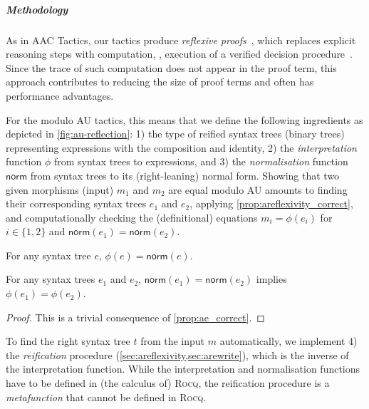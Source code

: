 \documentclass[a4paper,UKenglish,cleveref,autoref]{lipics-v2021}
\newcommand{\Rocq}{{\sffamily\scshape Rocq}\xspace}
\begin{document}
\subparagraph{Methodology}
As in AAC Tactics, our tactics produce \emph{reflexive proofs}~\cite{DBLP:conf/lics/AllenCHA90},
which replaces explicit reasoning steps with computation, \eg, execution of a verified decision
procedure~\cite{DBLP:conf/tphol/GregoireM05}.
Since the trace of such computation does not appear in the proof term, this approach contributes to
reducing the size of proof terms and often has performance advantages.

For the modulo AU tactics, this means that we define the following ingredients as depicted in
\cref{fig:au-reflection}:
1) the type of reified syntax trees (binary trees) representing expressions with the composition and
identity,
2) the \emph{interpretation} function $\phi$ from syntax trees to expressions, and
3) the \emph{normalisation} function $\mathsf{norm}$ from syntax trees to its (right-leaning) normal
form.
Showing that two given morphisms (input) $m_1$ and $m_2$ are equal modulo AU amounts to finding
their corresponding syntax trees $e_1$ and $e_2$, applying \cref{prop:areflexivity_correct}, and
computationally checking the (definitional) equations $m_i = \phi(e_i)$ for $i \in \{1, 2\}$ and
$\mathsf{norm}(e_1) = \mathsf{norm}(e_2)$.
\begin{proposition}
  \label{prop:ae_correct}
  For any syntax tree $e$, $\phi(e) = \mathsf{norm}(e)$.
\end{proposition}
\begin{proposition}
  \label{prop:areflexivity_correct}
  For any syntax trees $e_1$ and $e_2$, $\mathsf{norm}(e_1) = \mathsf{norm}(e_2)$ implies
  $\phi(e_1) = \phi(e_2)$.
\end{proposition}
\begin{proof}
  This is a trivial consequence of \cref{prop:ae_correct}.
\end{proof}
To find the right syntax tree $t$ from the input $m$ automatically, we implement 4) the
\emph{reification} procedure (\cref{sec:areflexivity,sec:arewrite}), which is the inverse of the
interpretation function.
While the interpretation and normalisation functions have to be defined in (the calculus of) \Rocq,
the reification procedure is a \emph{metafunction} that cannot be defined in \Rocq.
\end{document}
